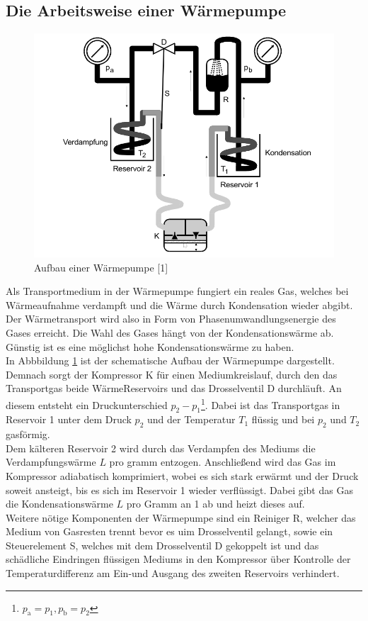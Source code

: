 \subsection{Die Arbeitsweise einer Wärmepumpe}
\begin{figure}
    \centering
    \includegraphics[scale=0.4]{aufbau.pdf}
    \caption{Aufbau einer Wärmepumpe [1]}
    \label{fig:aufbau}
\end{figure}
Als Transportmedium in der Wärmepumpe fungiert ein reales Gas,
welches bei Wärmeaufnahme verdampft und die Wärme durch Kondensation wieder abgibt. Der Wärmetransport wird also in Form 
von Phasenumwandlungsenergie des Gases erreicht.
Die Wahl des Gases hängt von der Kondensationswärme ab. Günstig ist es eine möglichst hohe Kondensationswärme zu haben. \\
In Abbbildung \ref{fig:aufbau} ist der schematische Aufbau der Wärmepumpe dargestellt.
Demnach sorgt der Kompressor K für einen Mediumkreislauf, durch den das Transportgas beide WärmeReservoirs und das Drosselventil D durchläuft.
An diesem entsteht ein Druckunterschied $p_2-p_1$\footnote{$p_\text{a}=p_1, p_\text{b}=p_2$}. Dabei ist das Transportgas in Reservoir 1 unter dem Druck $p_2$
und der Temperatur $T_1$ flüssig und bei $p_2$ und $T_2$ gasförmig.\\
Dem kälteren Reservoir 2 wird durch das Verdampfen des Mediums die Verdampfungswärme $L$ pro gramm entzogen. 
Anschließend wird das Gas im Kompressor adiabatisch komprimiert, wobei es sich stark erwärmt und der Druck soweit ansteigt, bis es sich im Reservoir 1
wieder verflüssigt. Dabei gibt das Gas die Kondensationswärme $L$ pro Gramm an 1 ab und heizt dieses auf.\\
Weitere nötige Komponenten der Wärmepumpe sind ein Reiniger R, welcher das Medium von Gasresten trennt bevor es uim Drosselventil gelangt, sowie ein Steuerelement S,
welches mit dem Drosselventil D gekoppelt ist und das schädliche Eindringen flüssigen Mediums in den Kompressor über Kontrolle der Temperaturdifferenz
am Ein-und Ausgang des zweiten Reservoirs verhindert. 
